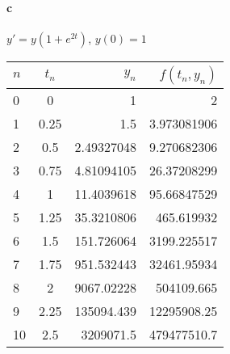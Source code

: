 \documentclass{article}
\begin{document}
\newpage

\paragraph{c} $y' = y(1+e^{2t})$, $y(0)=1$

\begin{table}[ht]
  \begin{center}
    \label{tab:2.c}
    \begin{tabular}{l|c|r|r} %
      $n$ & $t_{n}$ & $y_{n}$ & $f(t_{n},y_{n})$\\
      \hline
        0&0&1&2\\
        1&0.25&1.5&3.973081906\\
        2&0.5&2.49327048&9.270682306\\
        3&0.75&4.81094105&26.37208299\\
        4&1&11.4039618&95.66847529\\
        5&1.25&35.3210806&465.619932\\
        6&1.5&151.726064&3199.225517\\
        7&1.75&951.532443&32461.95934\\
        8&2&9067.02228&504109.665\\
        9&2.25&135094.439&12295908.25\\
        10&2.5&3209071.5&479477510.7\\
    \end{tabular}
  \end{center}
\end{table}
 
\end{document}
